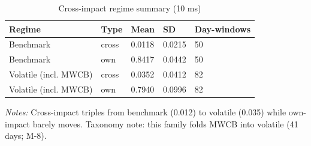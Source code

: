 \begin{table}[htbp]\centering
\caption{Cross-impact regime summary (10 ms)}
\label{tab:t16}
\small
\begin{tabular}{lllll}
\toprule
Regime & Type & Mean & SD & Day-windows \\
\midrule
Benchmark & cross & 0.0118 & 0.0215 & 50 \\
Benchmark & own & 0.8417 & 0.0442 & 50 \\
Volatile (incl. MWCB) & cross & 0.0352 & 0.0412 & 82 \\
Volatile (incl. MWCB) & own & 0.7940 & 0.0996 & 82 \\
\bottomrule
\end{tabular}
\begin{minipage}{\linewidth}\vspace{2pt}\footnotesize\emph{Notes:} Cross-impact triples from benchmark (0.012) to volatile (0.035) while own-impact barely moves. Taxonomy note: this family folds MWCB into volatile (41 days; M-8).\end{minipage}
\end{table}
